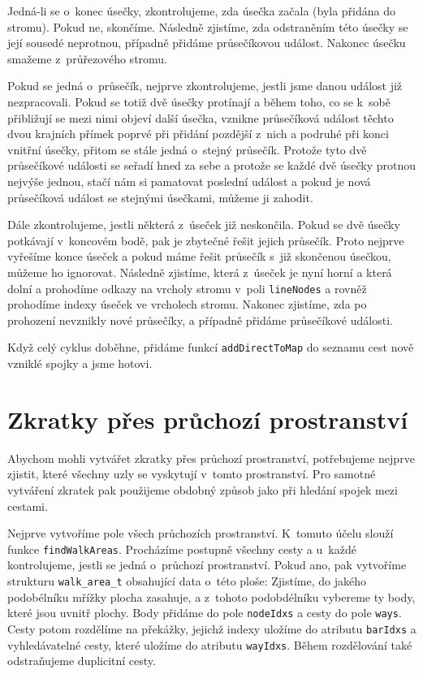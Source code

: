 Jedná-li se o~konec úsečky, zkontrolujeme, zda úsečka začala (byla přidána do
stromu). Pokud ne, skončíme. Následně zjistíme, zda odstraněním této úsečky se
její sousedé neprotnou, případně přidáme průsečíkovou událost. Nakonec úsečku
smažeme z~průřezového stromu.

Pokud se jedná o~průsečík, nejprve zkontrolujeme, jestli jsme danou událost již
nezpracovali. Pokud se totiž dvě úsečky protínají a během toho, co se k~sobě
přibližují se mezi nimi objeví další úsečka, vznikne průsečíková událost těchto
dvou krajních přímek poprvé při přidání pozdější z~nich a podruhé při konci
vnitřní úsečky, přitom se stále jedná o~stejný průsečík. Protože tyto dvě
průsečíkové události se seřadí hned za sebe a protože se každé dvě úsečky
protnou nejvýše jednou, stačí nám si pamatovat poslední událost a pokud je nová
průsečíková událost se stejnými úsečkami, můžeme ji zahodit.

Dále zkontrolujeme, jestli některá z~úseček již neskončila. Pokud se dvě úsečky
potkávají v~koncovém bodě, pak je zbytečné řešit jejich průsečík. Proto nejprve
vyřešíme konce úseček a pokud máme řešit průsečík s~již skončenou úsečkou,
můžeme ho ignorovat. Následně zjistíme, která z~úseček je nyní horní a která
dolní a prohodíme odkazy na vrcholy stromu v~poli \verb|lineNodes| a rovněž
prohodíme indexy úseček ve vrcholech stromu. Nakonec zjistíme, zda po prohození
nevznikly nové průsečíky, a případně přidáme průsečíkové události.

Když celý cyklus doběhne, přidáme funkcí \verb|addDirectToMap| do seznamu cest
nově vzniklé spojky a jsme hotovi.


\section{Zkratky přes průchozí prostranství}
Abychom mohli vytvářet zkratky přes průchozí prostranství, potřebujeme nejprve
zjistit, které všechny uzly se vyskytují v~tomto prostranství. Pro samotné
vytváření zkratek pak použijeme obdobný způsob jako při hledání spojek mezi
cestami. 

Nejprve vytvoříme pole všech průchozích prostranství.  K~tomuto účelu
slouží funkce \verb|findWalkAreas|. Procházíme postupně všechny cesty a u~každé
kontrolujeme, jestli se jedná o~průchozí prostranství. Pokud ano, pak vytvoříme
strukturu \verb|walk_area_t| obsahující data o~této ploše: Zjistíme, do jakého
podobélníku mřížky plocha zasahuje, a z~tohoto podobdélníku vybereme ty body,
které jsou uvnitř plochy. Body přidáme do pole \verb|nodeIdxs| a cesty do pole
\verb|ways|. Cesty potom rozdělíme na překážky, jejichž indexy uložíme do
atributu \verb|barIdxs| a vyhledávatelné cesty, které uložíme do atributu
\verb|wayIdxs|. Během rozdělování také odstraňujeme duplicitní cesty. 

